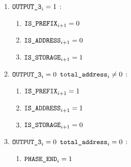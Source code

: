 \begin{enumerate}[resume]
\begin{enumerate}[resume]
\begin{enumerate}
			\item \If $\texttt{OUTPUT\_3}_{i} = 1$ \Then:
			\begin{enumerate}
				\item $\texttt{IS\_PREFIX} _{i+1} = 0$
				\item $\texttt{IS\_ADDRESS}   _{i+1} = 0$
				\item $\texttt{IS\_STORAGE}    _{i+1} = 1$
			\end{enumerate}

			\item \If $\texttt{OUTPUT\_3}_{i} = 0$ \et $\texttt{total\_address}_{i} \neq 0$ \Then:
			\begin{enumerate}
				\item $\texttt{IS\_PREFIX} _{i+1} = 1$
				\item $\texttt{IS\_ADDRESS}   _{i+1} = 1$
				\item $\texttt{IS\_STORAGE}    _{i+1} = 0$
			\end{enumerate}

			\item \If $\texttt{OUTPUT\_3}_{i} = 0$ \et $\texttt{total\_address}_{i} = 0$ \Then:
			\begin{enumerate}
				\item $\texttt{PHASE\_END} _{i} = 1$
			\end{enumerate}
		\end{enumerate}			
\end{enumerate}


\end{enumerate}
